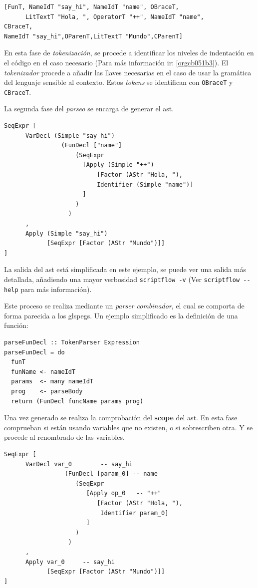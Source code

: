 \documentclass[11pt]{article}
\begin{document}
\begin{verbatim}
[FunT, NameIdT "say_hi", NameIdT "name", OBraceT,
      LitTextT "Hola, ", OperatorT "++", NameIdT "name",
CBraceT,
NameIdT "say_hi",OParenT,LitTextT "Mundo",CParenT]
\end{verbatim}

En esta fase de \emph{tokenización}, se procede a identificar los niveles de
indentación en el código en el caso necesario (Para más información ir: \ref{orgcb051b3}).
El \emph{tokenizador} procede a añadir las llaves necesarias en el caso de usar la
gramática del lenguaje sensible al contexto. Estos \emph{tokens} se identifican con
\texttt{OBraceT} y \texttt{CBraceT}.

La segunda fase del \emph{parseo} se encarga de generar el \gls{ast}.

\begin{verbatim}
SeqExpr [
      VarDecl (Simple "say_hi")
                (FunDecl ["name"]
                    (SeqExpr
                      [Apply (Simple "++")
                          [Factor (AStr "Hola, "),
                          Identifier (Simple "name")]
                      ]
                    )
                  )
      ,
      Apply (Simple "say_hi")
            [SeqExpr [Factor (AStr "Mundo")]]
]
\end{verbatim}

La salida del \gls{ast} está simplificada en este ejemplo, se puede ver una salida más detallada,
añadiendo una mayor verbosidad \texttt{scriptflow -v} (Ver \texttt{scriptflow -{}-help} para más información).

Este proceso se realiza mediante un \emph{parser combinador}, el cual se comporta de
forma parecida a los gls{pegs}. Un ejemplo simplificado es la definición de
una función:

\begin{verbatim}
parseFunDecl :: TokenParser Expression
parseFunDecl = do
  funT
  funName <- nameIdT
  params  <- many nameIdT
  prog    <- parseBody
  return (FunDecl funcName params prog)
\end{verbatim}

Una vez generado se realiza la comprobación del \textbf{scope} del \gls{ast}. En esta fase
comprueban si están usando variables que no existen, o si sobrescriben
otra. Y se procede al renombrado de las variables.

\begin{verbatim}
SeqExpr [
      VarDecl var_0        -- say_hi
                 (FunDecl [param_0] -- name
                    (SeqExpr
                       [Apply op_0   -- "++"
                          [Factor (AStr "Hola, "),
                           Identifier param_0]
                       ]
                    )
                  )
      ,
      Apply var_0     -- say_hi
            [SeqExpr [Factor (AStr "Mundo")]]
]
\end{verbatim}
\end{document}
